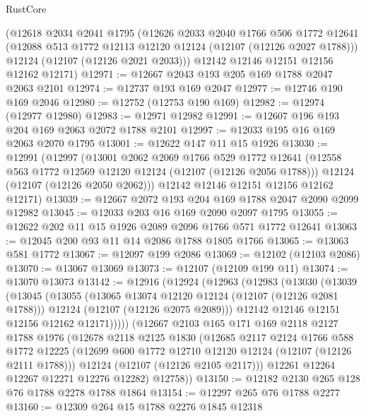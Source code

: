 \begin{lexlean}{RustCore}
\begin{coremodule}
    (@12618
      @2034
      @2041
      @1795
      (@12626
        @2033
        @2040
        @1766
        @506
        @1772
        @12641
        (@12088 @513 @1772 @12113 @12120 @12124 (@12107 (@12126 @2027 @1788)))
        @12124
        (@12107 (@12126 @2021 @2033)))
      @12142
      @12146
      @12151
      @12156
      @12162
      @12171)
@12971 := @12667 @2043 @193 @205 @169 @1788 @2047 @2063 @2101
@12974 := @12737 @193 @169 @2047
@12977 := @12746 @190 @169 @2046
@12980 := @12752 (@12753 @190 @169)
@12982 := @12974 (@12977 @12980)
@12983 := @12971 @12982
@12991 := @12607 @196 @193 @204 @169 @2063 @2072 @1788 @2101
@12997 := @12033 @195 @16 @169 @2063 @2070 @1795
@13001 := @12622 @147 @11 @15 @1926
@13030 := @12991
    (@12997
      (@13001
        @2062
        @2069
        @1766
        @529
        @1772
        @12641
        (@12558 @563 @1772 @12569 @12120 @12124 (@12107 (@12126 @2056 @1788)))
        @12124
        (@12107 (@12126 @2050 @2062)))
      @12142
      @12146
      @12151
      @12156
      @12162
      @12171)
@13039 := @12667 @2072 @193 @204 @169 @1788 @2047 @2090 @2099 @12982
@13045 := @12033 @203 @16 @169 @2090 @2097 @1795
@13055 := @12622 @202 @11 @15 @1926 @2089 @2096 @1766 @571 @1772 @12641
@13063 := @12045 @200 @93 @11 @14 @2086 @1788 @1805 @1766
@13065 := @13063 @581 @1772
@13067 := @12097 @199 @2086
@13069 := @12102 (@12103 @2086)
@13070 := @13067 @13069
@13073 := @12107 (@12109 @199 @11)
@13074 := @13070 @13073
@13142 := @12916
    (@12924
      (@12963
        (@12983
          (@13030
            (@13039
              (@13045
                (@13055
                  (@13065 @13074 @12120 @12124 (@12107 (@12126 @2081 @1788)))
                  @12124
                  (@12107 (@12126 @2075 @2089)))
                @12142
                @12146
                @12151
                @12156
                @12162
                @12171)))))
      (@12667
        @2103
        @165
        @171
        @169
        @2118
        @2127
        @1788
        @1976
        (@12678
          @2118
          @2125
          @1830
          (@12685
            @2117
            @2124
            @1766
            @588
            @1772
            @12225
            (@12699 @600 @1772 @12710 @12120 @12124 (@12107 (@12126 @2111 @1788)))
            @12124
            (@12107 (@12126 @2105 @2117)))
          @12261
          @12264
          @12267
          @12271
          @12276
          @12282)
        @12758))
@13150 := @12182 @2130 @265 @128 @76 @1788 @2278 @1788 @1864
@13154 := @12297 @265 @76 @1788 @2277
@13160 := @12309 @264 @15 @1788 @2276 @1845 @12318

\end{coremodule}
\end{lexlean}
